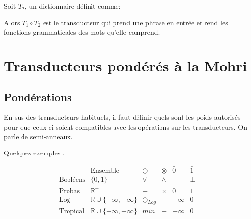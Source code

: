 \documentclass[a4paper, 12pt, fleqn]{article}
\begin{document}
Soit $T_2$, un dictionnaire définit comme:\\

Alors $T_1 \circ T_2$ est le transducteur qui prend une phrase en
entrée et rend les fonctions grammaticales des mots qu'elle comprend.

\section{Transducteurs pondérés \og à la Mohri\fg}
\label{sec:autom-pond}

\subsection{Pondérations}
\label{sec:ponderations}

En sus des transducteurs habituels, il faut définir quels sont les
poids autorisés pour que ceux-ci soient compatibles avec les
opérations sur les transducteurs. On parle de semi-anneaux.

Quelques exemples :

\begin{equation*}
  \begin{array}{l|lllll}
                    & \text{Ensemble}                      & \oplus       & \otimes & \bar{0} & \bar{1} \\
    \hline
    \text{Booléens} & \{0, 1\}                             & \lor         & \land   & \top    & \bot    \\
    \text{Probas}   & \mathbb{R}^+                         & +            & \times  & 0       & 1       \\
    \text{Log}      & \mathbb{R} \cup \{+\infty, -\infty\} & \oplus_{Log} & +       & +\infty & 0       \\
    \text{Tropical} & \mathbb{R} \cup \{+\infty, -\infty\} & min          & +       & +\infty & 0       \\
  \end{array}
\end{equation*}
\end{document}
